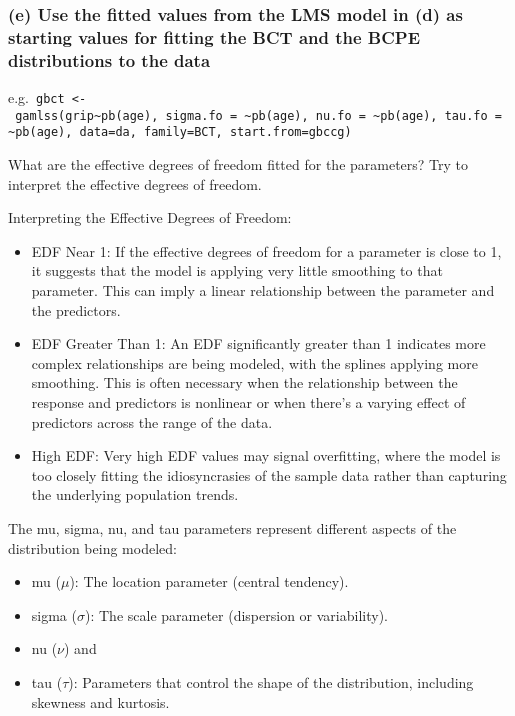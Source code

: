 \documentclass[
]{article}
\providecommand{\tightlist}{%
  \setlength{\itemsep}{0pt}\setlength{\parskip}{0pt}}
\begin{document}
\hypertarget{e-use-the-fitted-values-from-the-lms-model-in-d-as-starting-values-for-fitting-the-bct-and-the-bcpe-distributions-to-the-data}{%
\subsubsection{(e) Use the fitted values from the LMS model in (d) as
starting values for fitting the BCT and the BCPE distributions to the
data}\label{e-use-the-fitted-values-from-the-lms-model-in-d-as-starting-values-for-fitting-the-bct-and-the-bcpe-distributions-to-the-data}}

e.g.~\texttt{gbct\ \textless{}-\ gamlss(grip\textasciitilde{}pb(age),\ sigma.fo\ =\ \textasciitilde{}pb(age),\ nu.fo\ =\ \textasciitilde{}pb(age),\ tau.fo\ =\ \textasciitilde{}pb(age),\ data=da,\ family=BCT,\ start.from=gbccg)}

What are the effective degrees of freedom fitted for the parameters? Try
to interpret the effective degrees of freedom.

Interpreting the Effective Degrees of Freedom:

\begin{itemize}
\item
  EDF Near 1: If the effective degrees of freedom for a parameter is
  close to 1, it suggests that the model is applying very little
  smoothing to that parameter. This can imply a linear relationship
  between the parameter and the predictors.
\item
  EDF Greater Than 1: An EDF significantly greater than 1 indicates more
  complex relationships are being modeled, with the splines applying
  more smoothing. This is often necessary when the relationship between
  the response and predictors is nonlinear or when there's a varying
  effect of predictors across the range of the data.
\item
  High EDF: Very high EDF values may signal overfitting, where the model
  is too closely fitting the idiosyncrasies of the sample data rather
  than capturing the underlying population trends.
\end{itemize}

The mu, sigma, nu, and tau parameters represent different aspects of the
distribution being modeled:

\begin{itemize}
\tightlist
\item
  mu (\(\mu\)): The location parameter (central tendency).
\item
  sigma (\(\sigma\)): The scale parameter (dispersion or variability).
\item
  nu (\(\nu\)) and
\item
  tau (\(\tau\)): Parameters that control the shape of the distribution,
  including skewness and kurtosis.
\end{itemize}
\end{document}
